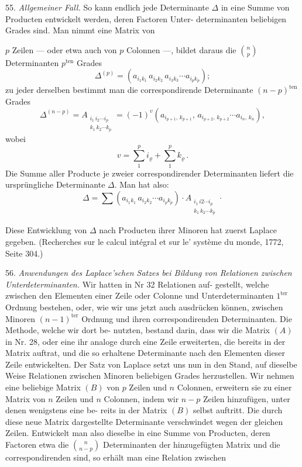 55. \textit{Allgemeiner Fall.} So kann endlich jede Determinante $\Delta$ in
eine Summe von Producten entwickelt werden, deren Factoren Unter-
determinanten beliebigen Grades sind. Man nimmt eine Matrix von


$p$ Zeilen — oder etwa auch von $p$ Colonnen —, bildet daraus die
$\binom{n}{p}$ Determinanten $p^{\text{ten}}$ Grades
\[
\Delta^{(p)} = \left(a_{i_1k_1}\, a_{i_2k_2}\, a_{i_3k_3}\cdots a_{i_pk_p}\right);
\]
zu jeder derselben bestimmt man die correspondirende Determinante
$(n-p)^{\text{ten}}$ Grades
\[
\Delta^{(n-p)} = A_{\substack{i_1\,i_2\cdots i_p\\ k_1\,k_2\cdots k_p}} = (-1)^{v}\left(a_{i_{p+1},\,k_{p+1}},\, a_{i_{p+2},\,k_{p+2}}\cdots a_{i_n,\,k_n}\right),
\]
wobei
\[
v = \sum_1^p i_\varrho + \sum_1^p k_\varrho \, .
\]
Die Summe aller Producte je zweier correspondirender Determinanten
liefert die ursprüngliche Determinante $\Delta$. Man hat also:
\[
\Delta = \sum \left(a_{i_1k_1}\, a_{i_2k_2}\cdots a_{i_pk_p}\right) \cdot A_{\substack{i_1\,i2\cdots i_p\\ k_1\,k_2\cdots k_p}} \cdot
\]

Diese Entwicklung von $\Delta$ nach Producten ihrer Minoren hat zuerst
Laplace gegeben. (Recherches sur le calcul intégral et sur le' système %
du monde, 1772, Seite 304.)

56. \textit{Anwendungen des Laplace'schen Satzes bei Bildung von Relationen
zwischen Unterdeterminanten.} Wir hatten in Nr 32 Relationen auf-
gestellt, welche zwischen den Elementen einer Zeile oder Colonne und
Unterdeterminanten $1^{\text{ter}}$ Ordnung bestehen, oder, wie wir uns jetzt auch
ausdrücken können, zwischen Minoren $(n-1)^{\text{ter}}$ Ordnung und ihren
correspondirenden Determinanten. Die Methode, welche wir dort be-
nutzten, bestand darin, dass wir die Matrix $(A)$ in Nr. 28, oder eine
ihr analoge durch eine Zeile erweiterten, die bereits in der Matrix
auftrat, und die so erhaltene Determinante nach den Elementen dieser
Zeile entwickelten. Der Satz von Laplace setzt uns nun in den Stand,
auf dieselbe Weise Relationen zwischen Minoren beliebigen Grades
herzustellen. Wir nehmen eine beliebige Matrix $(B)$ von $p$ Zeilen und
$n$ Colonnen, erweitern sie zu einer Matrix von $n$ Zeilen und $n$ Colonnen,
indem wir $n-p$ Zeilen hinzufügen, unter denen wenigstens eine be-
reits in der Matrix $(B)$ selbst auftritt. Die durch diese neue Matrix
dargestellte Determinante verschwindet wegen der gleichen Zeilen.
Entwickelt man also dieselbe in eine Summe von Producten, deren
Factoren etwa die $\binom{n}{n-p}$ Determinanten der hinzugefügten Matrix
und die correspondirenden sind, so erhält man eine Relation zwischen


